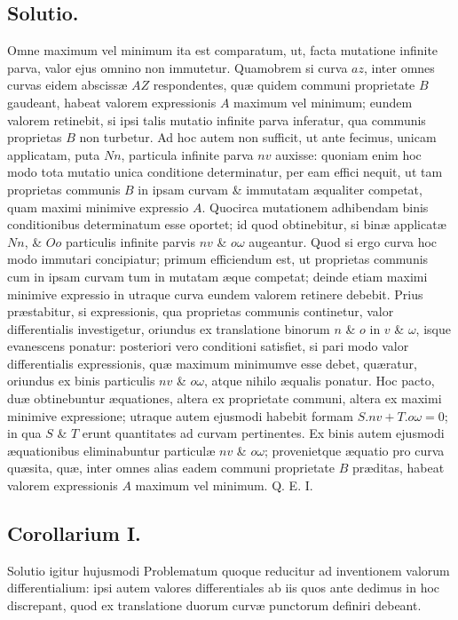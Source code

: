 \subsection*{Solutio.}
Omne maximum vel minimum ita est comparatum, ut, facta mutatione infinite parva, valor ejus omnino non immutetur. Quamobrem si curva $az$, inter omnes curvas eidem abscissæ $AZ$ respondentes, quæ quidem communi proprietate $B$ gaudeant, habeat valorem expressionis $A$ maximum vel minimum; eundem valorem retinebit, si ipsi talis mutatio infinite parva inferatur, qua communis proprietas $B$ non turbetur. Ad hoc autem non sufficit, ut ante fecimus, unicam applicatam, puta $Nn$, particula infinite parva $nv$ auxisse: quoniam enim hoc modo tota mutatio unica conditione determinatur, per eam effici nequit, ut tam proprietas communis $B$ in ipsam curvam \& immutatam æqualiter competat, quam maximi minimive expressio $A$. Quocirca mutationem adhibendam binis conditionibus
 determinatum esse oportet; id quod obtinebitur, si binæ applicatæ $Nn$, \& $Oo$ particulis infinite parvis $nv$ \& $o\omega$ augeantur. Quod si ergo curva hoc modo immutari concipiatur; primum efficiendum est, ut proprietas communis cum in ipsam curvam tum in mutatam æque competat; deinde etiam maximi minimive expressio in utraque curva eundem valorem retinere debebit. Prius præstabitur, si expressionis, qua proprietas communis continetur, valor differentialis investigetur, oriundus ex translatione binorum $n$ \& $o$ in $v$ \& $\omega$, isque evanescens ponatur: posteriori vero conditioni satisfiet, si pari modo valor differentialis expressionis, quæ maximum minimumve esse debet, quæratur, oriundus ex binis particulis $nv$ \& $o\omega$, atque nihilo æqualis ponatur. Hoc pacto, duæ obtinebuntur æquationes, altera ex proprietate communi, altera ex maximi minimive expressione; utraque autem ejusmodi habebit formam $S.nv+T.o\omega=0$; in qua $S$ \& $T$ erunt quantitates ad curvam pertinentes. Ex binis autem ejusmodi æquationibus eliminabuntur particulæ $nv$ \& $o\omega$; provenietque æquatio pro curva quæsita, quæ, inter omnes alias eadem communi proprietate $B$ præditas, habeat valorem expressionis $A$ maximum vel minimum. Q. E. I.

\subsection*{Corollarium I.}
Solutio igitur hujusmodi Problematum quoque reducitur ad inventionem valorum differentialium: ipsi autem valores differentiales ab iis quos ante dedimus in hoc discrepant, quod ex translatione duorum curvæ punctorum definiri debeant.

